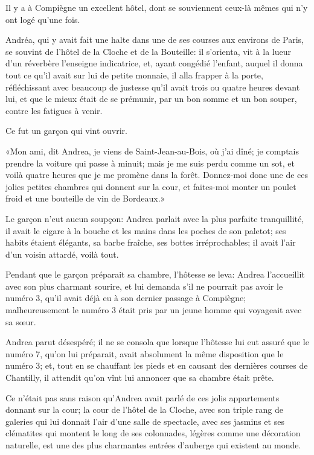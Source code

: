Il y a à Compiègne un excellent hôtel, dont se souviennent ceux-là mêmes qui n'y ont logé qu'une fois. 

Andréa, qui y avait fait une halte dans une de ses courses aux environs de Paris, se souvint de l'hôtel de la Cloche et de la Bouteille: il s'orienta, vit à la lueur d'un réverbère l'enseigne indicatrice, et, ayant congédié l'enfant, auquel il donna tout ce qu'il avait sur lui de petite monnaie, il alla frapper à la porte, réfléchissant avec beaucoup de justesse qu'il avait trois ou quatre heures devant lui, et que le mieux était de se prémunir, par un bon somme et un bon souper, contre les fatigues à venir. 

Ce fut un garçon qui vint ouvrir. 

«Mon ami, dit Andrea, je viens de Saint-Jean-au-Bois, où j'ai dîné; je comptais prendre la voiture qui passe à minuit; mais je me suis perdu comme un sot, et voilà quatre heures que je me promène dans la forêt. Donnez-moi donc une de ces jolies petites chambres qui donnent sur la cour, et faites-moi monter un poulet froid et une bouteille de vin de Bordeaux.» 

Le garçon n'eut aucun soupçon: Andrea parlait avec la plus parfaite tranquillité, il avait le cigare à la bouche et les mains dans les poches de son paletot; ses habits étaient élégants, sa barbe fraîche, ses bottes irréprochables; il avait l'air d'un voisin attardé, voilà tout. 

Pendant que le garçon préparait sa chambre, l'hôtesse se leva: Andrea l'accueillit avec son plus charmant sourire, et lui demanda s'il ne pourrait pas avoir le numéro 3, qu'il avait déjà eu à son dernier passage à Compiègne; malheureusement le numéro 3 était pris par un jeune homme qui voyageait avec sa sœur. 

Andrea parut désespéré; il ne se consola que lorsque l'hôtesse lui eut assuré que le numéro 7, qu'on lui préparait, avait absolument la même disposition que le numéro 3; et, tout en se chauffant les pieds et en causant des dernières courses de Chantilly, il attendit qu'on vînt lui annoncer que sa chambre était prête. 

Ce n'était pas sans raison qu'Andrea avait parlé de ces jolis appartements donnant sur la cour; la cour de l'hôtel de la Cloche, avec son triple rang de galeries qui lui donnait l'air d'une salle de spectacle, avec ses jasmins et ses clématites qui montent le long de ses colonnades, légères comme une décoration naturelle, est une des plus charmantes entrées d'auberge qui existent au monde. 

